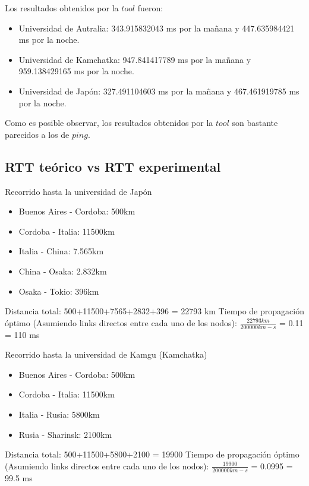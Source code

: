 Los resultados obtenidos por la $tool$ fueron:

\begin{itemize}
	\item Universidad de Autralia: 343.915832043 ms por la mañana y 447.635984421 ms por la noche.
	\item Universidad de Kamchatka: 947.841417789 ms por la mañana y 959.138429165 ms por la noche.
	\item Universidad de Japón: 327.491104603 ms por la mañana y 467.461919785 ms por la noche.
\end{itemize}

Como es posible observar, los resultados obtenidos por la $tool$ son bastante parecidos a los de $ping$.

\subsection{RTT teórico vs RTT experimental}

Recorrido hasta la universidad de Japón

\begin{itemize}
	\item Buenos Aires - Cordoba: 500km
	\item Cordoba - Italia: 11500km
	\item Italia - China: 7.565km
	\item China - Osaka: 2.832km
	\item Osaka - Tokio: 396km
\end{itemize}

Distancia total: 500+11500+7565+2832+396 = 22793 km
Tiempo de propagación óptimo (Asumiendo links directos entre cada uno de los nodos):
$\frac{22793km}{200000km-s}$ = 0.11 = 110 ms


Recorrido hasta la universidad de Kamgu (Kamchatka)

\begin{itemize}
	\item Buenos Aires - Cordoba: 500km
	\item Cordoba - Italia: 11500km
	\item Italia - Rusia: 5800km
	\item Rusia - Sharinsk:  2100km
\end{itemize}

Distancia total: 500+11500+5800+2100 = 19900
Tiempo de propagación óptimo (Asumiendo links directos entre cada uno de los nodos):
$\frac{19900}{200000km-s}$ = 0.0995 = 99.5 ms


